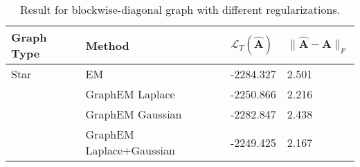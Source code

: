 \begin{table}[tb]
\caption{Result for blockwise-diagonal graph with different regularizations.}
\label{tab: prior results for block-diag}
\begin{tabular}{llll}
\toprule
\textbf{Graph Type} & \textbf{Method} & \textbf{$\mathcal{L}_T(\widehat{\mathbf{A}})$} & \textbf{$\| \widehat{\mathbf{A}} - \mathbf{A} \|_F$} \\
\midrule
Star & EM & -2284.327 & 2.501 \\
 & GraphEM Laplace & -2250.866 & 2.216 \\
 & GraphEM Gaussian & -2282.847 & 2.438 \\
 & GraphEM Laplace+Gaussian & -2249.425 & 2.167 \\
\bottomrule
\end{tabular}
\end{table}
